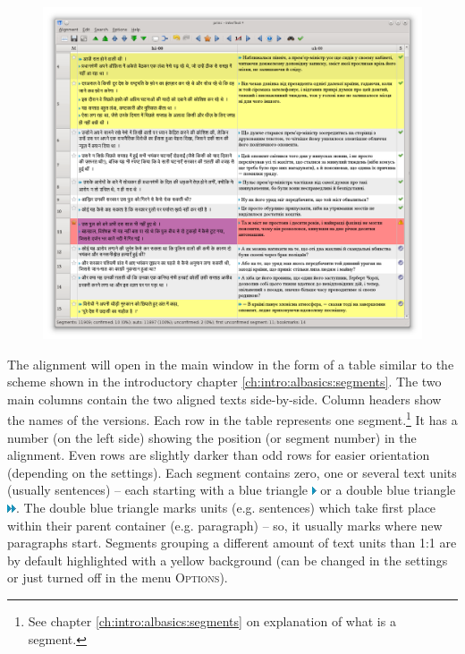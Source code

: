 \documentclass[a4paper,10pt,oneside]{book}
\newcommand{\menu}[1]{\textsc{#1}}
\begin{document}
\begin{figure}[htb]
 \includegraphics[width=\textwidth]{screenshots/mainwindow.png}
\end{figure}


The alignment will open in the main window in the form of a table similar to the scheme shown in the introductory chapter \ref{ch:intro:albasics:segments}. The two main columns contain the two aligned texts side-by-side. Column headers show the names of the versions. Each row in the table represents one segment.\footnote{See chapter \ref{ch:intro:albasics:segments} on explanation of what is a segment.} It has a number (on the left side) showing the position (or segment number) in the alignment. Even rows are slightly darker than odd rows for easier orientation (depending on the settings). Each segment contains zero, one or several text units (usually sentences) -- each starting with a blue triangle \includegraphics[height=1ex]{../images/16/arrow.png} or a double blue triangle \includegraphics[height=1ex]{../images/16/dblarrow.png}. The double blue triangle marks units (e.g. sentences) which take first place within their parent container (e.g. paragraph) -- so, it usually marks where new paragraphs start. Segments grouping a different amount of text units than 1:1 are by default highlighted with a yellow background (can be changed in the settings or just turned off in the menu \menu{Options}).
\end{document}
